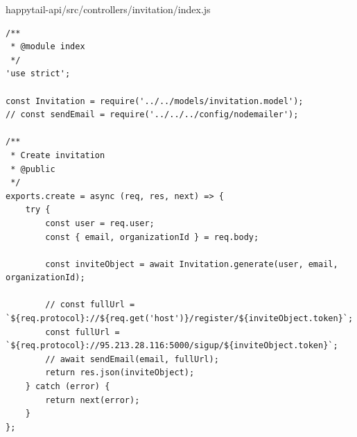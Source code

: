 \documentclass[12pt]{article}
\begin{document}
  \normalsize
 happytail-api/src/controllers/invitation/index.js
 \footnotesize
\begin{verbatim}
/**
 * @module index
 */
'use strict';

const Invitation = require('../../models/invitation.model');
// const sendEmail = require('../../../config/nodemailer');

/**
 * Create invitation
 * @public
 */
exports.create = async (req, res, next) => {
    try {
        const user = req.user;
        const { email, organizationId } = req.body;

        const inviteObject = await Invitation.generate(user, email, organizationId);

        // const fullUrl = `${req.protocol}://${req.get('host')}/register/${inviteObject.token}`;
        const fullUrl = `${req.protocol}://95.213.28.116:5000/sigup/${inviteObject.token}`;
        // await sendEmail(email, fullUrl);
        return res.json(inviteObject);
    } catch (error) {
        return next(error);
    }
};


 \end{verbatim}
 
\end{document}
